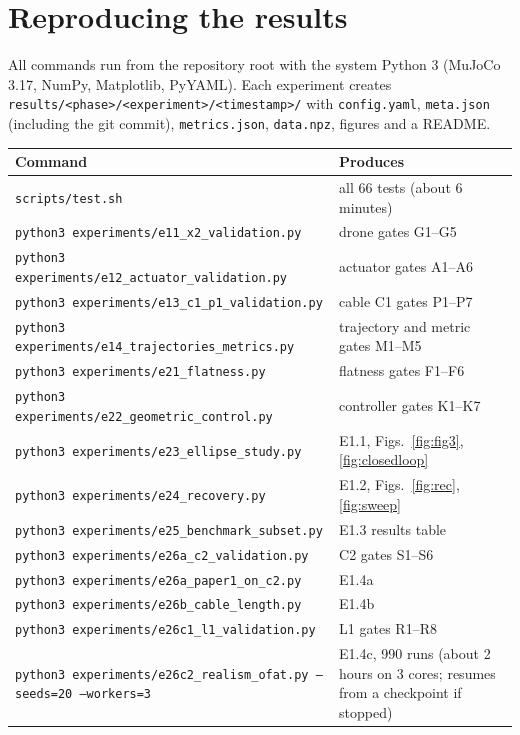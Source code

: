 \documentclass[11pt,a4paper]{article}
\newcommand{\code}[1]{\texttt{\small #1}}
\begin{document}
\appendix
\section{Reproducing the results}
\label{app:reproduce}
All commands run from the repository root with the system Python 3 (MuJoCo 3.17, NumPy, Matplotlib, PyYAML). Each
experiment creates \code{results/<phase>/<experiment>/<timestamp>/} with \code{config.yaml}, \code{meta.json}
(including the git commit), \code{metrics.json}, \code{data.npz}, figures and a README.

\begin{table}[H]
\centering\small
\begin{tabularx}{\textwidth}{@{}l X@{}}
\toprule
Command & Produces \\
\midrule
\code{scripts/test.sh} & all 66 tests (about 6 minutes) \\
\code{python3 experiments/e11\_x2\_validation.py} & drone gates G1--G5 \\
\code{python3 experiments/e12\_actuator\_validation.py} & actuator gates A1--A6 \\
\code{python3 experiments/e13\_c1\_p1\_validation.py} & cable C1 gates P1--P7 \\
\code{python3 experiments/e14\_trajectories\_metrics.py} & trajectory and metric gates M1--M5 \\
\code{python3 experiments/e21\_flatness.py} & flatness gates F1--F6 \\
\code{python3 experiments/e22\_geometric\_control.py} & controller gates K1--K7 \\
\code{python3 experiments/e23\_ellipse\_study.py} & E1.1, Figs.~\ref{fig:fig3}, \ref{fig:closedloop} \\
\code{python3 experiments/e24\_recovery.py} & E1.2, Figs.~\ref{fig:rec}, \ref{fig:sweep} \\
\code{python3 experiments/e25\_benchmark\_subset.py} & E1.3 results table \\
\code{python3 experiments/e26a\_c2\_validation.py} & C2 gates S1--S6 \\
\code{python3 experiments/e26a\_paper1\_on\_c2.py} & E1.4a \\
\code{python3 experiments/e26b\_cable\_length.py} & E1.4b \\
\code{python3 experiments/e26c1\_l1\_validation.py} & L1 gates R1--R8 \\
\code{python3 experiments/e26c2\_realism\_ofat.py --seeds=20 --workers=3} & E1.4c, 990 runs (about 2 hours on 3 cores; resumes from a checkpoint if stopped) \\
\bottomrule
\end{tabularx}
\end{table}
\end{document}

